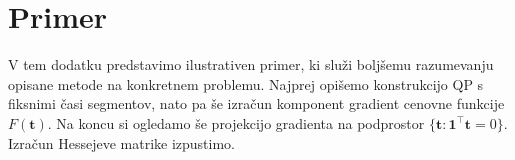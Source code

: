 \documentclass[isrm2, tisk]{fmfdelo}
\newcommand{\tvec}{\mathbf{t}}
\begin{document}










\appendix

\section{Primer}
\label{app:example}
V tem dodatku predstavimo ilustrativen primer, ki služi boljšemu razumevanju opisane metode na konkretnem problemu. Najprej opišemo konstrukcijo QP s fiksnimi časi segmentov, nato pa še izračun komponent gradient cenovne funkcije $F(\tvec)$. Na koncu si ogledamo še projekcijo gradienta na podprostor $\lbrace \tvec : \mathbf{1}^\top \tvec = 0 \rbrace$. Izračun Hessejeve matrike izpustimo.
\end{document}

